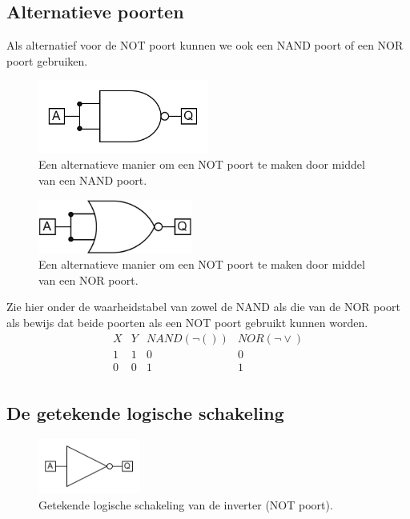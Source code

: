 \documentclass[12pt]{article}
\begin{document}
\subsection{Alternatieve poorten}
Als alternatief voor de NOT poort kunnen we ook een NAND poort of een NOR poort gebruiken.

\begin{figure}[h]
    \centering
    \includegraphics[width=0.5\textwidth]{NAND-NOT.png}
    \caption{Een alternatieve manier om een NOT poort te maken door middel van een NAND poort.}
    \label{fig:NANDNOT}
\end{figure}

\begin{figure}[h]
    \centering
    \includegraphics[width=0.45\textwidth]{NOR-NOT.png}
    \caption{Een alternatieve manier om een NOT poort te maken door middel van een NOR poort.}
    \label{fig:NORNOT}
\end{figure}
Zie hier onder de waarheidstabel van zowel de NAND als die van de NOR poort als bewijs dat beide poorten als een NOT poort gebruikt kunnen worden.
\begin{displaymath}
    \begin{array}{|c|c||c|c|}
    X & Y & NAND (\lnot()) & NOR (\lnot\lor)\\
    \hline 
    1 & 1 & 0 & 0\\
    0 & 0 & 1 & 1\\
    \end{array}
    \end{displaymath}

\subsection{De getekende logische schakeling}
\begin{figure}[h]
    \centering
    \includegraphics[width=0.3\textwidth]{INV.png}
    \caption{Getekende logische schakeling van de inverter (NOT poort).}
    \label{fig:INV}
\end{figure}
\end{document}
